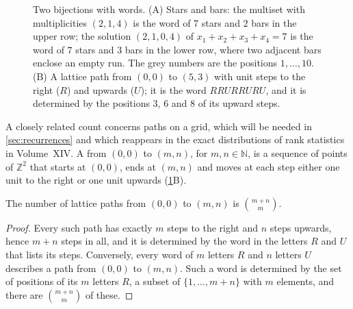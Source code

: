 \begin{figure}
\hfill
{}
\caption{Two bijections with words. (A) Stars and bars: the multiset with multiplicities $(2,1,4)$ is the word of $7$ stars and $2$ bars in the upper row; the solution $(2,1,0,4)$ of $x_1+x_2+x_3+x_4=7$ is the word of $7$ stars and $3$ bars in the lower row, where two adjacent bars enclose an empty run. The grey numbers are the positions $1,\ldots,10$. (B) A lattice path from $(0,0)$ to $(5,3)$ with unit steps to the right ($R$) and upwards ($U$); it is the word $RRURRURU$, and it is determined by the positions $3$, $6$ and $8$ of its upward steps.}
\label{fig:stars-bars}
\end{figure}

A closely related count concerns paths on a grid, which will be needed in \cref{sec:recurrences} and which reappears in the exact distributions of rank statistics in Volume~XIV. A  from $(0,0)$ to $(m,n)$, for $m,n\in\mathbb N$, is a sequence of points of $\mathbb Z^2$ that starts at $(0,0)$, ends at $(m,n)$ and moves at each step either one unit to the right or one unit upwards (\cref{fig:stars-bars}B).

\begin{proposition}
\label{prop:lattice-paths}
The number of lattice paths from $(0,0)$ to $(m,n)$ is $\binom{m+n}{m}$.
\end{proposition}

\begin{proof}
Every such path has exactly $m$ steps to the right and $n$ steps upwards, hence $m+n$ steps in all, and it is determined by the word in the letters $R$ and $U$ that lists its steps. Conversely, every word of $m$ letters $R$ and $n$ letters $U$ describes a path from $(0,0)$ to $(m,n)$. Such a word is determined by the set of positions of its $m$ letters $R$, a subset of $\{1,\ldots,m+n\}$ with $m$ elements, and there are $\binom{m+n}{m}$ of these.
\end{proof}

